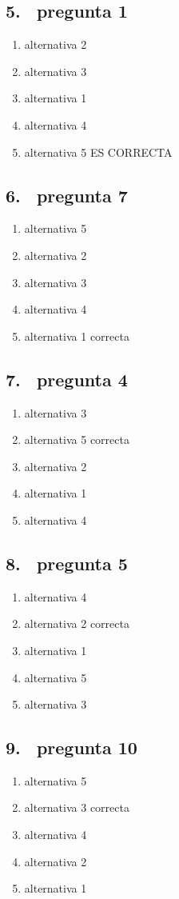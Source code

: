 \documentclass[8pt]{article}
\begin{document}
\subsection*{5. \  pregunta 1}
\begin{enumerate}[label=(\alph*)]
\item alternativa 2
\item alternativa 3
\item alternativa 1 
\item alternativa 4 
\item alternativa 5 ES CORRECTA
\end{enumerate}
\subsection*{6. \  pregunta 7}
\begin{enumerate}[label=(\alph*)]
\item alternativa 5
\item alternativa 2
\item alternativa 3 
\item alternativa 4 
\item alternativa 1 correcta
\end{enumerate}
\subsection*{7. \  pregunta 4}
\begin{enumerate}[label=(\alph*)]
\item alternativa 3
\item alternativa 5 correcta
\item alternativa 2 
\item alternativa 1
\item alternativa 4 
\end{enumerate}
\subsection*{8. \  pregunta 5}
\begin{enumerate}[label=(\alph*)]
\item alternativa 4
\item alternativa 2 correcta
\item alternativa 1 
\item alternativa 5
\item alternativa 3 
\end{enumerate}
\subsection*{9. \  pregunta 10}
\begin{enumerate}[label=(\alph*)]
\item alternativa 5
\item alternativa 3 correcta
\item alternativa 4 
\item alternativa 2
\item alternativa 1 
\end{enumerate}
\end{document}
